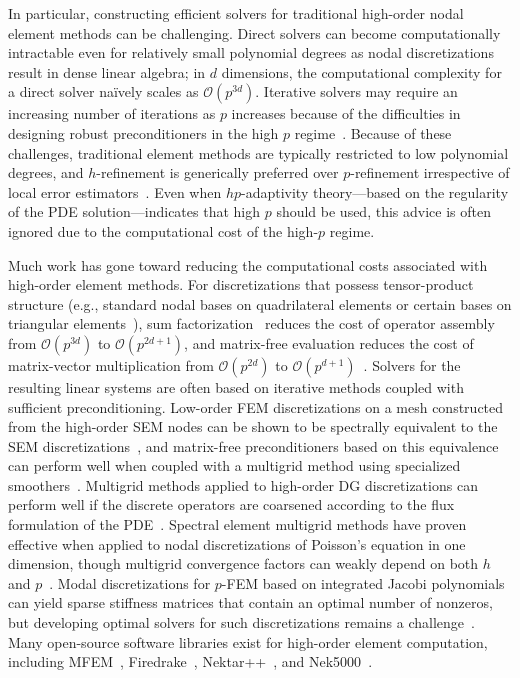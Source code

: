 In particular, constructing efficient solvers for traditional high-order nodal element methods can be challenging. Direct solvers can become computationally intractable even for relatively small polynomial degrees as nodal discretizations result in dense linear algebra; in $d$ dimensions, the computational complexity for a direct solver na\"{i}vely scales as $\mathcal{O}(p^{3d})$. Iterative solvers may require an increasing number of iterations as $p$ increases because of the difficulties in designing robust preconditioners in the high $p$ regime~\cite{Orszag_80_01}. Because of these challenges, traditional element methods are typically restricted to low polynomial degrees, and $h$-refinement is generically preferred over $p$-refinement irrespective of local error estimators~\cite{Vos_10_01}. Even when $hp$-adaptivity theory---based on the regularity of the PDE solution---indicates that high $p$ should be used, this advice is often ignored due to the computational cost of the high-$p$ regime.

Much work has gone toward reducing the computational costs associated with high-order element methods. For discretizations that possess tensor-product structure (e.g., standard nodal bases on quadrilateral elements or certain bases on triangular elements~\cite{Sherwin_95_01}), sum factorization~\cite{Orszag_80_01} reduces the cost of operator assembly from $\mathcal{O}(p^{3d})$ to $\mathcal{O}(p^{2d+1})$, and matrix-free evaluation reduces the cost of matrix-vector multiplication from $\mathcal{O}(p^{2d})$ to $\mathcal{O}(p^{d+1})$~\cite[Tab.~1]{MFEM}. Solvers for the resulting linear systems are often based on iterative methods coupled with sufficient preconditioning. Low-order FEM discretizations on a mesh constructed from the high-order SEM nodes can be shown to be spectrally equivalent to the SEM discretizations~\cite{Canuto_07_01}, and matrix-free preconditioners based on this equivalence can perform well when coupled with a multigrid method using specialized smoothers~\cite{Pazner_19_01}. Multigrid methods applied to high-order DG discretizations can perform well if the discrete operators are coarsened according to the flux formulation of the PDE~\cite{Fortunato_19_02}. Spectral element multigrid methods have proven effective when applied to nodal discretizations of Poisson's equation in one dimension, though multigrid convergence factors can weakly depend on both $h$ and $p$~\cite{Ronquist_87_01,Maday_88_01}. Modal discretizations for $p$-FEM based on integrated Jacobi polynomials can yield sparse stiffness matrices that contain an optimal number of nonzeros, but developing optimal solvers for such discretizations remains a challenge~\cite{Beuchler_06_01}. Many open-source software libraries exist for high-order element computation, including MFEM~\cite{MFEM}, Firedrake~\cite{Firedrake}, Nektar++~\cite{Nektar,Nektar2}, and Nek5000~\cite{Nek5000}.

